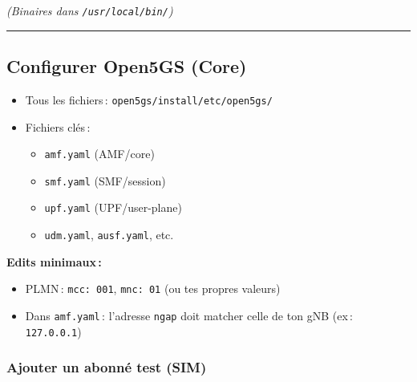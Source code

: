 \documentclass[
]{article}
\newenvironment{Shaded}{\begin{snugshade}}{\end{snugshade}}
\newcommand{\AttributeTok}[1]{\textcolor[rgb]{0.13,0.29,0.53}{#1}}
\newcommand{\BuiltInTok}[1]{#1}
\newcommand{\FunctionTok}[1]{\textcolor[rgb]{0.13,0.29,0.53}{\textbf{#1}}}
\newcommand{\KeywordTok}[1]{\textcolor[rgb]{0.13,0.29,0.53}{\textbf{#1}}}
\newcommand{\NormalTok}[1]{#1}
\newcommand{\VariableTok}[1]{\textcolor[rgb]{0.00,0.00,0.00}{#1}}
\providecommand{\tightlist}{%
  \setlength{\itemsep}{0pt}\setlength{\parskip}{0pt}}
\begin{document}
\begin{Shaded}
\end{Shaded}

\emph{(Binaires dans \texttt{/usr/local/bin/})}

\begin{center}\rule{0.5\linewidth}{0.5pt}\end{center}

\subsection{Configurer Open5GS (Core)}\label{configurer-open5gs-core}

\begin{itemize}
\item
  Tous les fichiers\,: \texttt{open5gs/install/etc/open5gs/}
\item
  Fichiers clés\,:

  \begin{itemize}
  \tightlist
  \item
    \texttt{amf.yaml} (AMF/core)
  \item
    \texttt{smf.yaml} (SMF/session)
  \item
    \texttt{upf.yaml} (UPF/user-plane)
  \item
    \texttt{udm.yaml}, \texttt{ausf.yaml}, etc.
  \end{itemize}
\end{itemize}

\textbf{Edits minimaux\,:}

\begin{itemize}
\tightlist
\item
  PLMN\,: \texttt{mcc:\ 001}, \texttt{mnc:\ 01} (ou tes propres valeurs)
\item
  Dans \texttt{amf.yaml}\,: l'adresse \texttt{ngap} doit matcher celle
  de ton gNB (ex\,: \texttt{127.0.0.1})
\end{itemize}

\subsubsection{Ajouter un abonné test
(SIM)}\label{ajouter-un-abonnuxe9-test-sim}
\end{document}
